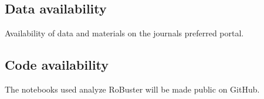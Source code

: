 \documentclass[sn-mathphys,Numbered]{sn-jnl}%
\theoremstyle{thmstyleone}%
\theoremstyle{thmstyletwo}%
\theoremstyle{thmstylethree}%
\begin{document}
\subsection*{Data availability}
%
Availability of data and materials on the journals preferred portal.
%
%
%
\subsection*{Code availability}
%
The notebooks used analyze RoBuster will be made public on GitHub.
%
%
%
%
%
%
%
%
%
%
%
%
%
%
%


\end{document}
